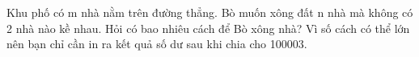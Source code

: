 Khu phố có m nhà nằm trên đường thẳng. Bò muốn xông đất n nhà mà không có 2 nhà nào kề nhau. Hỏi có bao nhiêu cách để Bò xông nhà? Vì số cách có thể lớn nên bạn chỉ cần in ra kết quả số dư sau khi chia cho 100003.